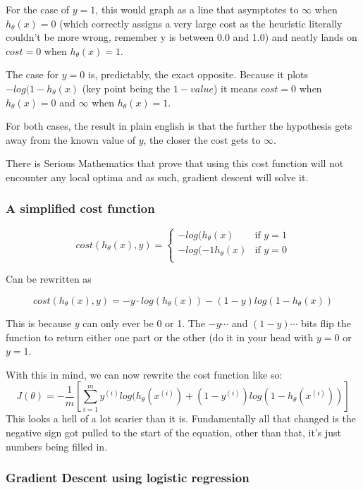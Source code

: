 For the case of $y = 1$, this would graph as a line that asymptotes to $\infty$ when $h_\theta(x) = 0$ (which correctly assigns a very large cost as the heuristic literally couldn't be more wrong, remember y is between 0.0 and 1.0) and neatly lands on $cost = 0$ when $h_\theta(x) = 1$.

The case for $y = 0$ is, predictably, the exact opposite. Because it plots $-log(1 - h_\theta(x)$ (key point being the $1 - value$) it means $cost = 0$ when $h_\theta(x) = 0$ and $\infty$ when $h_\theta(x) = 1$.

For both cases, the result in plain english is that the further the hypothesis gets away from the known value of $y$, the closer the cost gets to $\infty$.

There is Serious Mathematics that prove that using this cost function will not encounter any local optima and as such, gradient descent will solve it.

\subsubsection{A simplified cost function}

\[
cost(h_\theta(x), y) = \begin{cases}
    -log(h_\theta(x) & \text{if $y = 1$}\\
    -log(-1 h_\theta(x) & \text{if $y = 0$}\\
	\end{cases}
\]

Can be rewritten as

\begin{equation}
cost(h_\theta(x), y) = -y\cdot log(h_\theta(x)) - 
	(1 - y)log(1-h_\theta(x))
\end{equation}

This is because $y$ can only ever be 0 or 1. The $-y\cdots$ and $(1-y)\cdots$ bits flip the function to return either one part or the other (do it in your head with $y=0$ or $y=1$.

With this in mind, we can now rewrite the cost function like so:
\begin{equation}
	J(\theta) = -\frac{1}{m}[\sum^m_{i = 1}
	y^{(i)}log(h_\theta(x^{(i)}) + (1-y^{(i)})log(1-h_\theta(x^{(i)}))]
\end{equation}
This looks a hell of a lot scarier than it is. Fundamentally all that changed is the negative sign got pulled to the start of the equation, other than that, it's just numbers being filled in.

\subsubsection{Gradient Descent using logistic regression}

